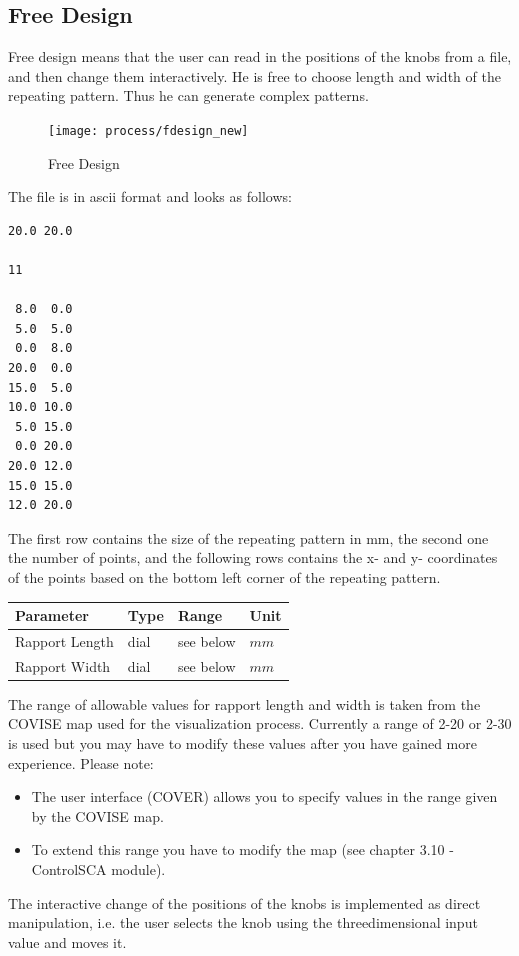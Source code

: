 \subsection{Free Design}
Free design means that the user can read in the positions of the knobs from a 
file, and then change them interactively.  He is free to choose length and 
width of the repeating pattern. Thus he can generate complex patterns.


\begin{figure}[!Hhtp]
  \begin{center}
   \texttt{[image: process/fdesign\_new]}
   \caption{Free Design}
  \end{center}
\end{figure}


The file is in ascii format and looks as follows:
\begin{samepage}
\begin{verbatim}
20.0 20.0

11

 8.0  0.0
 5.0  5.0
 0.0  8.0
20.0  0.0
15.0  5.0
10.0 10.0
 5.0 15.0
 0.0 20.0
20.0 12.0
15.0 15.0
12.0 20.0
\end{verbatim}
\end{samepage}

The first row contains the size of the repeating pattern in mm, 
the second one the number of points, and the following rows contains 
the x- and y- coordinates of the points based on the bottom left 
corner of the repeating pattern. 


\vspace{0.5cm}
\begin{tabular}{|l|l|l|l|} \hline
Parameter 		& Type 		& Range 	& Unit		\\ \hline
Rapport Length		& dial	& see below	& $mm$			\\ \hline
Rapport Width	 	& dial	& see below	& $mm$ 			\\ \hline
\end{tabular}
\vspace{0.5cm}

The range of allowable values for rapport length and width is taken from the
COVISE map used for the visualization process. Currently a range of 2-20 or
2-30 is used but you may have to modify these values after you have gained more
experience.\newline
\newline
Please note: 
\begin{itemize}
\item The user interface (COVER) allows you to specify
values in the range given by the COVISE map. 
\item To extend this range you have to
modify the map (see chapter 3.10 - ControlSCA module).
\end{itemize}  
The interactive change of the positions of the knobs is implemented as 
direct manipulation, i.e. the user selects the knob using the threedimensional 
input value and moves it.


